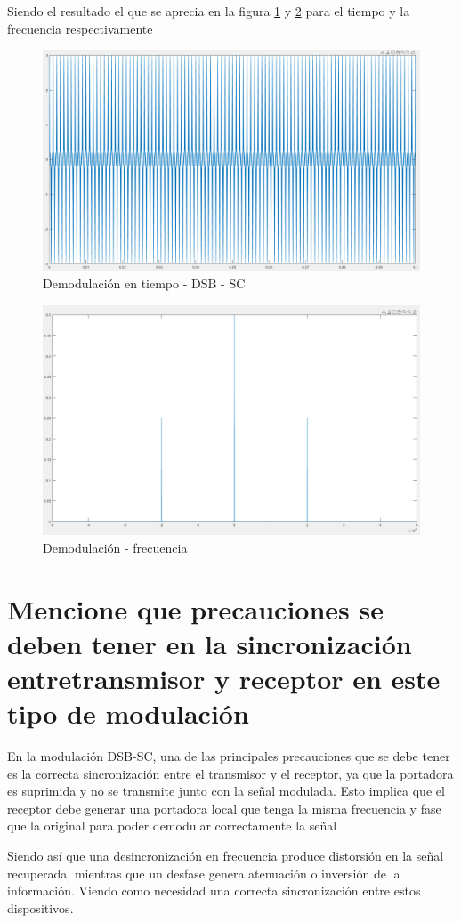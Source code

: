 \documentclass[conference]{IEEEtran}
\begin{document}
	Siendo el resultado el que se aprecia en la figura \ref{fig:demo-dsb-sc-tiempo} y \ref{fig:demo-dsb-sc-frecuencia} para el tiempo y la frecuencia respectivamente
	
	\begin{figure}[h]
		\centering
		\includegraphics[width=0.5\linewidth]{media/demo-dsb-sc-tiempo}
		\caption{Demodulación en tiempo - DSB - SC}
		\label{fig:demo-dsb-sc-tiempo}
	\end{figure}
	
	\begin{figure}[h]
		\centering
		\includegraphics[width=0.5\linewidth]{media/demo-dsb-sc-frecuencia}
		\caption{Demodulación - frecuencia}
		\label{fig:demo-dsb-sc-frecuencia}
	\end{figure}
	
	
	\section{Mencione que precauciones se deben tener en la sincronización entretransmisor y receptor en este tipo de modulación}
	
	En la modulación DSB-SC, una de las principales precauciones que se debe tener es la correcta sincronización entre el transmisor y el receptor, ya que la portadora es suprimida y no se transmite junto con la señal modulada. Esto implica que el receptor debe generar una portadora local que tenga la misma frecuencia y fase que la original para poder demodular correctamente la señal
	
	Siendo así que una desincronización en frecuencia produce distorsión en la señal recuperada, mientras que un desfase genera atenuación o inversión de la información. Viendo como necesidad una correcta sincronización entre estos dispositivos.
	
\end{document}
